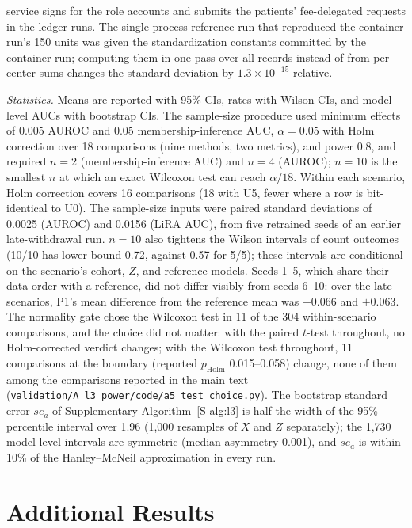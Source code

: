 service signs for the role accounts and submits the patients' fee-delegated requests in the ledger runs. The single-process reference run that reproduced the container run's 150 units was given the standardization constants committed by the container run; computing them in one pass over all records instead of from per-center sums changes the standard deviation by $1.3\times10^{-15}$ relative.

\emph{Statistics.} Means are reported with 95\% CIs, rates with Wilson CIs, and model-level AUCs with bootstrap CIs. The sample-size procedure used minimum effects of 0.005 AUROC and 0.05 membership-inference AUC, $\alpha=0.05$ with Holm correction over 18 comparisons (nine methods, two metrics), and power 0.8, and required $n=2$ (membership-inference AUC) and $n=4$ (AUROC); $n=10$ is the smallest $n$ at which an exact Wilcoxon test can reach $\alpha/18$. Within each scenario, Holm correction covers 16 comparisons (18 with U5, fewer where a row is bit-identical to U0). The sample-size inputs were paired standard deviations of 0.0025 (AUROC) and 0.0156 (LiRA AUC), from five retrained seeds of an earlier late-withdrawal run. $n=10$ also tightens the Wilson intervals of count outcomes (10/10 has lower bound 0.72, against 0.57 for 5/5); these intervals are conditional on the scenario's cohort, $Z$, and reference models. Seeds 1--5, which share their data order with a reference, did not differ visibly from seeds 6--10: over the late scenarios, P1's mean difference from the reference mean was $+0.066$ and $+0.063$. The normality gate chose the Wilcoxon test in 11 of the 304 within-scenario comparisons, and the choice did not matter: with the paired $t$-test throughout, no Holm-corrected verdict changes; with the Wilcoxon test throughout, 11 comparisons at the boundary (reported $p_{\mathrm{Holm}}$ 0.015--0.058) change, none of them among the comparisons reported in the main text (\texttt{validation/A\_l3\_power/code/a5\_test\_choice.py}). The bootstrap standard error $\mathit{se}_a$ of Supplementary Algorithm~\ref{S-alg:l3} is half the width of the 95\% percentile interval over 1.96 (1{,}000 resamples of $X$ and $Z$ separately); the 1{,}730 model-level intervals are symmetric (median asymmetry 0.001), and $\mathit{se}_a$ is within 10\% of the Hanley--McNeil approximation in every run.

\section{Additional Results}
\label{app:results}

